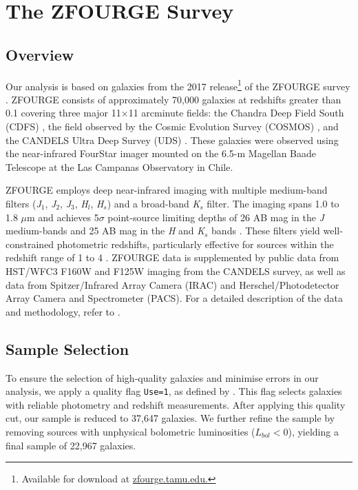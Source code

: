 \section{The ZFOURGE Survey} \label{Sec: The ZFOURGE Survey}
\subsection{Overview}
Our analysis is based on galaxies from the 2017 release\footnote{Available for download at \href{https://zfourge.tamu.edu/}{zfourge.tamu.edu.}} of the ZFOURGE survey \citep{straatman_fourstar_2016}. ZFOURGE consists of approximately 70,000 galaxies at redshifts greater than 0.1 covering three major 11$\times$11 arcminute fields: the Chandra Deep Field South (CDFS) \citep{giacconi_chandra_2002}, the field observed by the Cosmic Evolution Survey (COSMOS) \citep{scoville_cosmic_2007}, and the CANDELS Ultra Deep Survey (UDS) \citep{lawrence_ukirt_2007}. These galaxies were observed using the near-infrared FourStar imager \citep{persson_fourstar_2013} mounted on the 6.5-m Magellan Baade Telescope at the Las Campanas Observatory in Chile. 

ZFOURGE employs deep near-infrared imaging with multiple medium-band filters (\textit{J}$_{1}$, \textit{J}$_2$, \textit{J}$_{3}$, \textit{H}$_{l}$, \textit{H}$_{s}$) and a broad-band \textit{K}$_{s}$ filter. The imaging spans 1.0 to 1.8 $\mu$m and achieves 5$\sigma$ point-source limiting depths of 26 AB mag in the \textit{J} medium-bands and 25 AB mag in the \textit{H} and \textit{K}$_{s}$ bands \citep{spitler_first_2012}. These filters yield well-constrained photometric redshifts, particularly effective for sources within the redshift range of 1 to 4 \citep{spitler_first_2012}. ZFOURGE data is supplemented by public data from HST/WFC3 F160W and F125W imaging from the CANDELS survey, as well as data from Spitzer/Infrared Array Camera (IRAC) and Herschel/Photodetector Array Camera and Spectrometer (PACS). For a detailed description of the data and methodology, refer to \cite{straatman_fourstar_2016}.

\subsection{Sample Selection}
To ensure the selection of high-quality galaxies and minimise errors in our analysis, we apply a quality flag \texttt{Use=1}, as defined by \cite{straatman_fourstar_2016}. This flag selects galaxies with reliable photometry and redshift measurements. After applying this quality cut, our sample is reduced to 37,647 galaxies. We further refine the sample by removing sources with unphysical bolometric luminosities ($L_{bol} < 0$), yielding a final sample of 22,967 galaxies.

